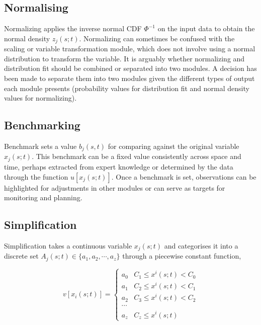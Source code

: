 \documentclass[
]{interact}
\begin{document}
\subsection{Normalising}\label{normalising}

Normalizing applies the inverse normal CDF \(\Phi^{-1}\) on the input
data to obtain the normal density \(z_{j}(s;t)\). Normalizing can
sometimes be confused with the scaling or variable transformation
module, which does not involve using a normal distribution to transform
the variable. It is arguably whether normalizing and distribution fit
should be combined or separated into two modules. A decision has been
made to separate them into two modules given the different types of
output each module presents (probability values for distribution fit and
normal density values for normalizing).

\subsection{Benchmarking}\label{benchmarking}

Benchmark sets a value \(b_j(s,t)\) for comparing against the original
variable \(x_j(s;t)\). This benchmark can be a fixed value consistently
across space and time, perhaps extracted from expert knowledge or
determined by the data through the function \(u[x_j(s;t)]\). Once a
benchmark is set, observations can be highlighted for adjustments in
other modules or can serve as targets for monitoring and planning.

\subsection{Simplification}\label{simplification}

Simplification takes a continuous variable \(x_j(s;t)\) and categorises
it into a discrete set \(A_j(s;t) \in \{a_1, a_2, \cdots, a_z\}\)
through a piecewise constant function,

\begin{equation}
v[x_i(s;t)] = 
\begin{cases}
a_0 & C_1 \leq x^i(s; t) < C_0 \\
a_1 & C_2 \leq x^i(s; t) < C_1 \\
a_2 & C_3 \leq x^i(s; t) < C_2 \\
\cdots \\
a_z & C_z \leq x^i(s; t)
\end{cases}
\end{equation}
\end{document}
